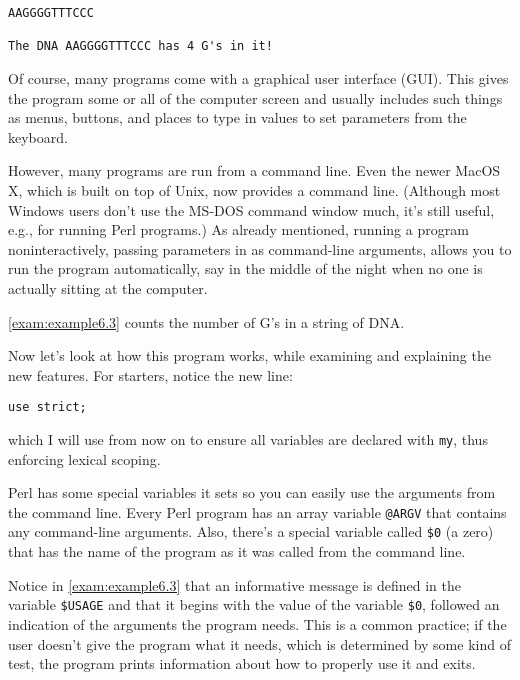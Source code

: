 \begin{lstlisting}
AAGGGGTTTCCC

The DNA AAGGGGTTTCCC has 4 G's in it!
\end{lstlisting}

Of course, many programs come with a graphical user interface (GUI). This gives the program some or all of the computer screen and usually includes such things as menus, buttons, and places to type in values to set parameters from the keyboard.

However, many programs are run from a command line. Even the newer MacOS X, which is built on top of Unix, now provides a command line. (Although most Windows users don't use the MS-DOS command window much, it's still useful, e.g., for running Perl programs.) As already mentioned, running a program noninteractively, passing parameters in as command-line arguments, allows you to run the program automatically, say in the middle of the night when no one is actually sitting at the computer.  

\autoref{exam:example6.3} counts the number of G's in a string of DNA. 



Now let's look at how this program works, while examining and explaining the new features. For starters, notice the new line:

\begin{lstlisting}
use strict;
\end{lstlisting}

which I will use from now on to ensure all variables are declared with \verb|my|, thus enforcing lexical scoping.

Perl has some special variables it sets so you can easily use the arguments from the command line. Every Perl program has an array variable \verb|@ARGV| that contains any command-line arguments. Also, there's a special variable called \verb|$0| (a zero) that has the name of the program as it was called from the command line.

Notice in \autoref{exam:example6.3} that an informative message is defined in the variable \verb|$USAGE| and that it begins with the value of the variable \verb|$0|, followed an indication of the arguments the program needs. This is a common practice; if the user doesn't give the program what it needs, which is determined by some kind of test, the program prints information about how to properly use it and exits.

